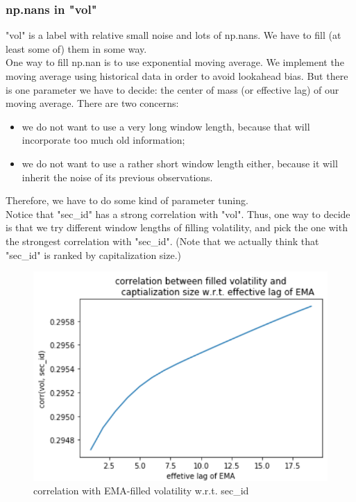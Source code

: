 \documentclass[onecolumn]{article}
\begin{document}
\subsubsection{np.nans in "vol"}
"vol" is a label with relative small noise and lots of np.nans. We have to fill (at least some of) them in some way.\\
\indent One way to fill np.nan is to use exponential moving average. We implement the moving average using historical data in order to avoid lookahead bias. But there is one parameter we have to decide: the center of mass (or effective lag) of our moving average. There are two concerns:
\begin{itemize}
    \item we do not want to use a very long window length, because that will incorporate too much old information;
    \item we do not want to use a rather short window length either, because it will inherit the noise of its previous observations.
\end{itemize}
\noindent Therefore, we have to do some kind of parameter tuning.\\

\indent Notice that "sec\_id" has a strong correlation with "vol". Thus, one way to decide is that we try different window lengths of filling volatility, and pick the one with the strongest correlation with "sec\_id". (Note that we actually think that "sec\_id" is ranked by capitalization size.) 

\begin{figure}[ht]
\centering
\includegraphics[scale=0.6]{corr_vol_sec_id.PNG}
\caption{correlation with EMA-filled volatility w.r.t. sec\_id}
\label{fig:label}
\end{figure}
\end{document}
